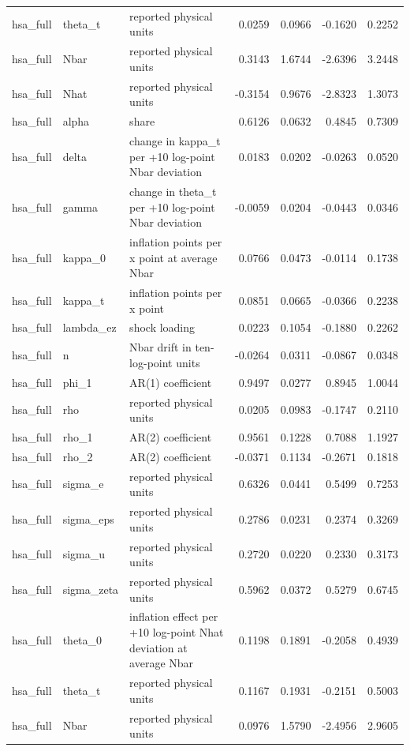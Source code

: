 \begin{tabular}{lllrrrr}
hsa\_full & theta\_t & reported physical units & 0.0259 & 0.0966 & -0.1620 & 0.2252 \\
hsa\_full & Nbar & reported physical units & 0.3143 & 1.6744 & -2.6396 & 3.2448 \\
hsa\_full & Nhat & reported physical units & -0.3154 & 0.9676 & -2.8323 & 1.3073 \\
hsa\_full & alpha & share & 0.6126 & 0.0632 & 0.4845 & 0.7309 \\
hsa\_full & delta & change in kappa\_t per +10 log-point Nbar deviation & 0.0183 & 0.0202 & -0.0263 & 0.0520 \\
hsa\_full & gamma & change in theta\_t per +10 log-point Nbar deviation & -0.0059 & 0.0204 & -0.0443 & 0.0346 \\
hsa\_full & kappa\_0 & inflation points per x point at average Nbar & 0.0766 & 0.0473 & -0.0114 & 0.1738 \\
hsa\_full & kappa\_t & inflation points per x point & 0.0851 & 0.0665 & -0.0366 & 0.2238 \\
hsa\_full & lambda\_ez & shock loading & 0.0223 & 0.1054 & -0.1880 & 0.2262 \\
hsa\_full & n & Nbar drift in ten-log-point units & -0.0264 & 0.0311 & -0.0867 & 0.0348 \\
hsa\_full & phi\_1 & AR(1) coefficient & 0.9497 & 0.0277 & 0.8945 & 1.0044 \\
hsa\_full & rho & reported physical units & 0.0205 & 0.0983 & -0.1747 & 0.2110 \\
hsa\_full & rho\_1 & AR(2) coefficient & 0.9561 & 0.1228 & 0.7088 & 1.1927 \\
hsa\_full & rho\_2 & AR(2) coefficient & -0.0371 & 0.1134 & -0.2671 & 0.1818 \\
hsa\_full & sigma\_e & reported physical units & 0.6326 & 0.0441 & 0.5499 & 0.7253 \\
hsa\_full & sigma\_eps & reported physical units & 0.2786 & 0.0231 & 0.2374 & 0.3269 \\
hsa\_full & sigma\_u & reported physical units & 0.2720 & 0.0220 & 0.2330 & 0.3173 \\
hsa\_full & sigma\_zeta & reported physical units & 0.5962 & 0.0372 & 0.5279 & 0.6745 \\
hsa\_full & theta\_0 & inflation effect per +10 log-point Nhat deviation at average Nbar & 0.1198 & 0.1891 & -0.2058 & 0.4939 \\
hsa\_full & theta\_t & reported physical units & 0.1167 & 0.1931 & -0.2151 & 0.5003 \\
hsa\_full & Nbar & reported physical units & 0.0976 & 1.5790 & -2.4956 & 2.9605 \\

\end{tabular}
